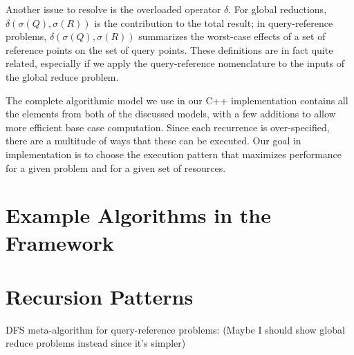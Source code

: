 \documentclass[times, 10pt,twocolumn]{article}
\begin{document}
Another issue to resolve is the overloaded operator $\delta$.
For global reductions, $\delta(\sigma(Q), \sigma(R))$ is the contribution to the total result; in query-reference problems, $\delta(\sigma(Q), \sigma(R))$ summarizes the worst-case effects of a set of reference points on the set of query points.
These definitions are in fact quite related, especially if we apply the query-reference nomenclature to the inputs of the global reduce problem.

The complete algorithmic model we use in our C++ implementation contains all the elements from both of the discussed models, with a few additions to allow more efficient base case computation.
Since each recurrence is over-specified, there are a multitude of ways that these can be executed.
Our goal in implementation is to choose the execution pattern that maximizes performance for a given problem and for a given set of resources.

\section{Example Algorithms in the Framework}

\section{Recursion Patterns}

DFS meta-algorithm for query-reference problems:
(Maybe I should show global reduce problems instead since it's simpler)
\end{document}
